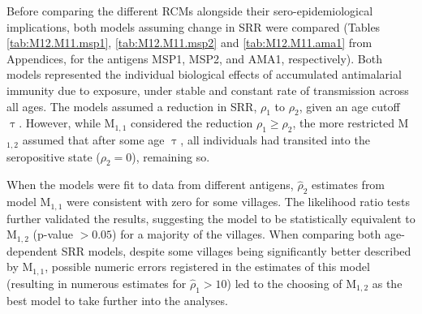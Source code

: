 Before comparing the different RCMs alongside their sero-epidemiological implications, both models assuming change in SRR were compared (Tables \ref{tab:M12.M11.msp1}, \ref{tab:M12.M11.msp2} and \ref{tab:M12.M11.ama1} from Appendices, for the antigens MSP1, MSP2, and AMA1, respectively).
Both models
represented the individual biological effects of accumulated antimalarial immunity due to exposure, under stable and constant rate of transmission across all ages.
The models assumed a reduction in SRR, $\rho_1$ to $\rho_2$, given an age cutoff $\uptau$.
However, while M$_{1,1}$ considered the reduction $\rho_1\geq\rho_2$, the more restricted M$_{1,2}$ assumed that after some age $\uptau$, all individuals had transited into the seropositive state ($\rho_2=0$), remaining so.

When the models were fit to data from different antigens, $ \widehat{\rho}_2$ estimates from model M$_{1,1}$ were consistent with zero for some villages.
The likelihood ratio tests further validated the results, suggesting the model to be statistically equivalent to M$_{1,2}$ (p-value $>0.05$) for a majority of the villages.
When comparing both age-dependent SRR models, despite some villages being significantly better described by M$_{1,1}$, possible numeric errors registered in the estimates of this model (resulting in numerous estimates for $ \widehat{\rho}_1>10$) led to the choosing of M$_{1,2}$ as the best model to take further into the analyses.

